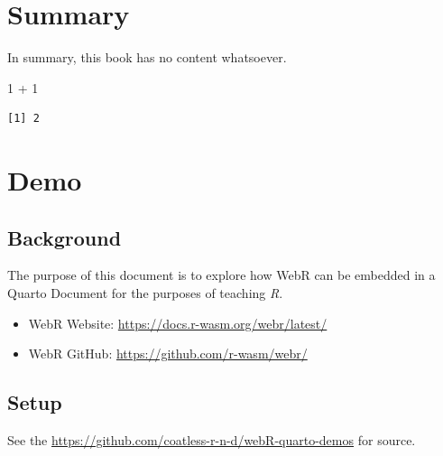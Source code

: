 \documentclass[
  letterpaper,
  DIV=11,
  oneside]{scrreprt}
\newenvironment{Shaded}{\begin{snugshade}}{\end{snugshade}}
\newcommand{\DecValTok}[1]{\textcolor[rgb]{0.68,0.00,0.00}{#1}}
\newcommand{\SpecialCharTok}[1]{\textcolor[rgb]{0.37,0.37,0.37}{#1}}
\providecommand{\tightlist}{%
  \setlength{\itemsep}{0pt}\setlength{\parskip}{0pt}}\usepackage{longtable,booktabs,array}
\begin{document}
\begin{figure}
\begin{minipage}[t]{0.50\linewidth}
{{}

}

\end{minipage}%

\end{figure}


\hypertarget{summary}{%
\chapter{Summary}\label{summary}}

In summary, this book has no content whatsoever.

\begin{Shaded}
\begin{Highlighting}[]
\DecValTok{1} \SpecialCharTok{+} \DecValTok{1}
\end{Highlighting}
\end{Shaded}

\begin{verbatim}
[1] 2
\end{verbatim}


\hypertarget{demo}{%
\chapter{Demo}\label{demo}}

\hypertarget{background}{%
\section{Background}\label{background}}

The purpose of this document is to explore how WebR can be embedded in a
Quarto Document for the purposes of teaching \emph{R}.

\begin{itemize}
\tightlist
\item
  WebR Website: \url{https://docs.r-wasm.org/webr/latest/}
\item
  WebR GitHub: \url{https://github.com/r-wasm/webr/}
\end{itemize}

\hypertarget{setup}{%
\section{Setup}\label{setup}}

See the \url{https://github.com/coatless-r-n-d/webR-quarto-demos} for
source.
\end{document}

